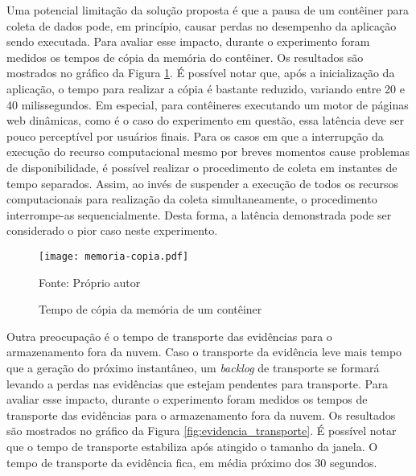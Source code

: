 %
%
%

Uma potencial limitação da solução proposta é que a pausa de um contêiner para coleta de dados pode, em princípio, causar perdas no desempenho da aplicação sendo executada. 
%
Para avaliar esse impacto, durante o experimento foram medidos os tempos de cópia da memória do contêiner.
%
Os resultados são mostrados no gráfico da Figura \ref{fig:memoria-copia}.
%
É possível notar que, após a inicialização da aplicação, o tempo para realizar a cópia é bastante reduzido, variando entre 20 e 40 milissegundos. 
%
Em especial, para contêineres executando um motor de páginas web dinâmicas, como é o caso do experimento em questão, essa latência deve ser pouco perceptível por usuários finais.
%
Para os casos em que a interrupção da execução do recurso computacional mesmo por breves momentos cause problemas de disponibilidade, é possível realizar o procedimento de coleta em instantes de tempo separados.
%
Assim, ao invés de suspender a execução de todos os recursos computacionais para realização da coleta simultaneamente, o procedimento interrompe-as sequencialmente.
%
Desta forma, a latência demonstrada pode ser considerado o pior caso neste experimento.

\begin{figure}[htb!]
\footnotesize
\caption{Tempo de cópia da memória de um contêiner}
\texttt{[image: memoria-copia.pdf]}
\centering
\label{fig:memoria-copia}
\begin{center}
Fonte: Próprio autor 
\end{center}
\end{figure}


Outra preocupação é o tempo de transporte das evidências para o armazenamento fora da nuvem.
%
Caso o transporte da evidência leve mais tempo que a geração do próximo instantâneo, um \textit{backlog} de transporte se formará levando a perdas nas evidências que estejam pendentes para transporte.
%
Para avaliar esse impacto, durante o experimento foram medidos os tempos de transporte das evidências para o armazenamento fora da nuvem.
%
Os resultados são mostrados no gráfico da Figura \ref{fig:evidencia_transporte}.
%
É possível notar que o tempo de transporte estabiliza após atingido o tamanho da janela. O tempo de transporte da evidência fica, em média próximo dos 30 segundos. 

